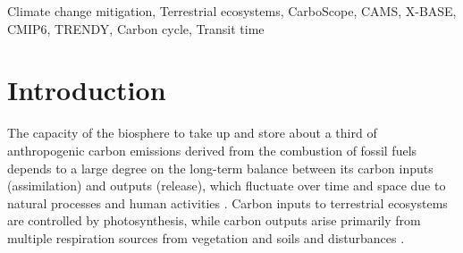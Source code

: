 \documentclass[ProofPDF]{./Styles/Jnls-Template-V3}
\begin{document}
\begin{abstract}[ABSTRACT]

\end{abstract}

\begin{keyword}[KEYWORDS:]

Climate change mitigation, Terrestrial ecosystems, CarboScope, CAMS, X-BASE, CMIP6, TRENDY, Carbon cycle, Transit time
\end{keyword}

\maketitle

\section{Introduction}
The capacity of the biosphere to take up and store about a third of anthropogenic carbon emissions derived from the combustion of fossil fuels \citep{Ruehr2023,Friedlingstein2025} depends to a large degree on the long-term balance between its carbon inputs (assimilation) and outputs (release), which fluctuate over time and space due to natural processes and human activities \citep{Malhi1999}. Carbon inputs to terrestrial ecosystems are controlled by photosynthesis, while carbon outputs arise primarily from multiple respiration sources from vegetation and soils and disturbances \citep{Wisniewski1993}. 
\end{document}
